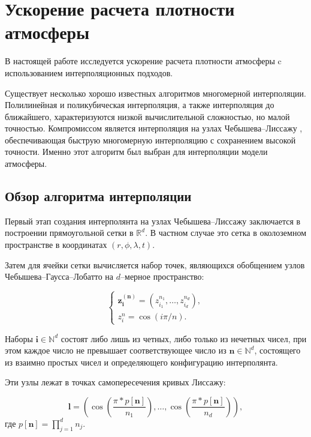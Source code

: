 \section{Ускорение расчета плотности атмосферы}
\label{sec:Chapter2} 

В настоящей работе исследуется ускорение расчета плотности атмосферы c
использованием интерполяционных подходов.

Существует несколько хорошо известных алгоритмов многомерной интерполяции. Полилинейная и
поликубическая интерполяция, а также интерполяция до ближайшего, характеризуются низкой
вычислительной сложностью, но малой точностью. 
Компромиссом является интерполяция на узлах Чебышева--Лиссажу \cite{dencker2017}, обеспечивающая
быструю многомерную интерполяцию с сохранением высокой точности. 
Именно этот алгоритм был выбран для интерполяции модели атмосферы.

\subsection{Обзор алгоритма интерполяции}
Первый этап создания интерполянта на узлах Чебышева--Лиссажу заключается в построении 
прямоугольной сетки в $\mathbb{R}^d$. В частном случае это сетка в
околоземном пространстве в координатах $(r, \phi, \lambda, t)$.

Затем для ячейки сетки вычисляется набор точек, являющихся обобщением
узлов Чебышева--Гаусса--Лобатто на $d$--мерное пространство:

\begin{equation*}
    \begin{cases*}
        \mathbf{z_{\mathbf{i}}^{\mathbf{(\mathbf{n})}}} = (z_{i_1}^{n_1}, \dots, z_{i_d}^{n_d}), \\
        z_i^{n} = \cos (i \pi / n).
    \end{cases*}
\end{equation*}

Наборы $\mathbf{i} \in \mathbb{N}^d$ состоят либо лишь из четных, либо только из нечетных чисел, при этом каждое
число не превышает соответствующее число из $\mathbf{n} \in \mathbb{N}^d$, 
состоящего из взаимно простых чисел и определяющего конфигурацию интерполянта.

Эти узлы лежат в точках самопересечения кривых Лиссажу:

\begin{equation*}
    \mathbf{l} = \left(\cos \left( \frac{\pi * p[\mathbf{n}]}{n_1} \right), 
                \dots,\cos \left( \frac{\pi * p[\mathbf{n}]}{n_d} \right) \right),
\end{equation*}
где $p[\mathbf{n}] = \prod_{j=1}^{d} n_j$.

